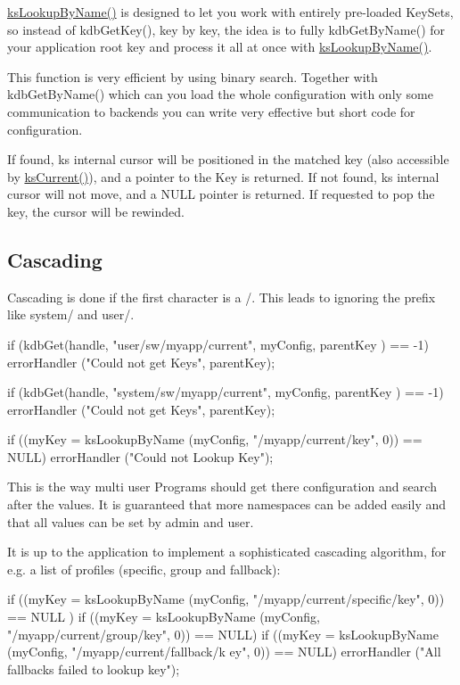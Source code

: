 {\ttfamily \hyperlink{group__keyset_gad2e30fb6d4739d917c5abb2ac2f9c1a1}{ksLookupByName()}} is designed to let you work with entirely pre-\/loaded KeySets, so instead of kdbGetKey(), key by key, the idea is to fully kdbGetByName() for your application root key and process it all at once with {\ttfamily \hyperlink{group__keyset_gad2e30fb6d4739d917c5abb2ac2f9c1a1}{ksLookupByName()}}.

This function is very efficient by using binary search. Together with kdbGetByName() which can you load the whole configuration with only some communication to backends you can write very effective but short code for configuration.

If found, {\ttfamily ks} internal cursor will be positioned in the matched key (also accessible by \hyperlink{group__keyset_ga4287b9416912c5f2ab9c195cb74fb094}{ksCurrent()}), and a pointer to the Key is returned. If not found, {\ttfamily ks} internal cursor will not move, and a NULL pointer is returned. If requested to pop the key, the cursor will be rewinded.\hypertarget{group__keyset_cascading}{}\subsection{Cascading}\label{group__keyset_cascading}
Cascading is done if the first character is a /. This leads to ignoring the prefix like system/ and user/. 
\begin{DoxyCode}
if (kdbGet(handle, "user/sw/myapp/current", myConfig, parentKey ) == -1)
        errorHandler ("Could not get Keys", parentKey);

if (kdbGet(handle, "system/sw/myapp/current", myConfig, parentKey ) == -1)
        errorHandler ("Could not get Keys", parentKey);

if ((myKey = ksLookupByName (myConfig, "/myapp/current/key", 0)) == NULL)
        errorHandler ("Could not Lookup Key");
\end{DoxyCode}


This is the way multi user Programs should get there configuration and search after the values. It is guaranteed that more namespaces can be added easily and that all values can be set by admin and user.

It is up to the application to implement a sophisticated cascading algorithm, for e.g. a list of profiles (specific, group and fallback): 
\begin{DoxyCode}
if ((myKey = ksLookupByName (myConfig, "/myapp/current/specific/key", 0)) == NULL
      )
        if ((myKey = ksLookupByName (myConfig, "/myapp/current/group/key", 0)) ==
       NULL)
                if ((myKey = ksLookupByName (myConfig, "/myapp/current/fallback/k
      ey", 0)) == NULL)
                        errorHandler ("All fallbacks failed to lookup key");
\end{DoxyCode}


